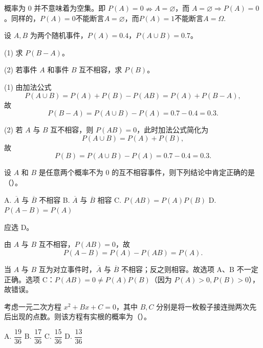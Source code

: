 \documentclass[lang=cn,11pt]{elegantbook}
\begin{document}
\begin{note}
概率为 0 并不意味着为空集。即 \(P(A) = 0 \nRightarrow A = \varnothing\)，而 \(A = \varnothing \Rightarrow P(A) = 0\)。同样的，$P(A) = 0$不能断言$A = \varnothing$，而$P(A) = 1$不能断言$A = \Omega$.
\end{note}

\begin{exercise}\label{exer:1-3}
设 \(A, B\) 为两个随机事件，\(P(A) = 0.4\)，\(P(A \cup B) = 0.7\)。\par
(1) 求 \(P(B - A)\)。\par
(2) 若事件 \(A\) 和事件 \(B\) 互不相容，求 \(P(B)\)。
\end{exercise}

\begin{solution}
(1) 由加法公式
\[
P(A \cup B) = P(A) + P(B) - P(AB) = P(A) + P(B - A),
\]
故
\[
P(B - A) = P(A \cup B) - P(A) = 0.7 - 0.4 = 0.3.
\]

(2) 若 \(A\) 与 \(B\) 互不相容，则 \(P(AB) = 0\)，此时加法公式简化为
\[
P(A \cup B) = P(A) + P(B),
\]
故
\[
P(B) = P(A \cup B) - P(A) = 0.7 - 0.4 = 0.3.
\]
\end{solution}


\begin{exercise}\label{exer:1-27}
设 \(A\) 和 \(B\) 是任意两个概率不为 0 的互不相容事件，则下列结论中肯定正确的是（\quad）。\par
A. \(\overline{A}\) 与 \(\overline{B}\) 不相容\quad
B. \(\overline{A}\) 与 \(\overline{B}\) 相容\quad
C. \(P(AB) = P(A)P(B)\)\quad
D. \(P(A-B) = P(A)\)
\end{exercise}

\begin{solution}
应选 D。

由 \(A\) 与 \(B\) 互不相容，\(P(AB) = 0\)，故
\[P(A-B) = P(A) - P(AB) = P(A).\]

当 \(A\) 与 \(B\) 互为对立事件时，\(\overline{A}\) 与 \(\overline{B}\) 不相容；反之则相容。故选项 A、B 不一定正确。选项 C：\(P(AB) = 0 \neq P(A)P(B)\)（因为 \(P(A)>0, P(B)>0\)），故错误。
\end{solution}
\begin{exercise}\label{exer:1-35}
考虑一元二次方程 \(x^2+Bx+C=0\)，其中 \(B,C\) 分别是将一枚骰子接连抛两次先后出现的点数。则该方程有实根的概率为（\quad）。\par
A. \(\dfrac{19}{36}\)\quad
B. \(\dfrac{17}{36}\)\quad
C. \(\dfrac{15}{36}\)\quad
D. \(\dfrac{13}{36}\)
\end{exercise}
\end{document}
